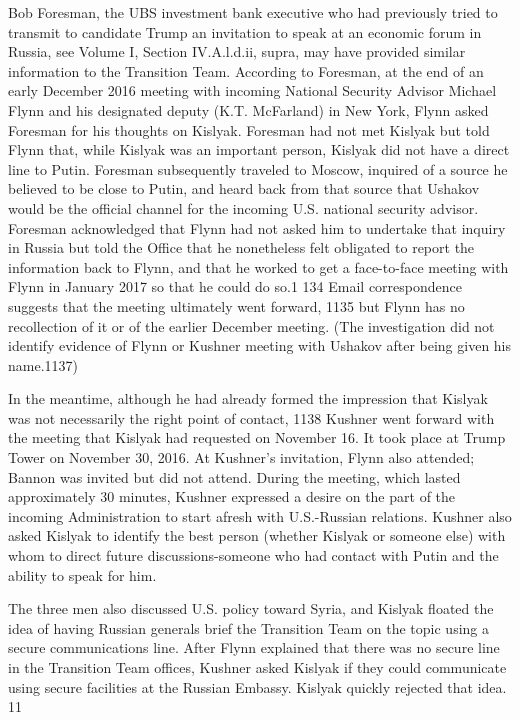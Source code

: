 Bob Foresman, the UBS investment bank executive who had previously tried to transmit to candidate Trump an invitation to speak at an economic forum in Russia, see Volume I, Section IV.A.l.d.ii, supra, may have provided similar information to the Transition Team. According to Foresman, at the end of an early December 2016 meeting with incoming National Security Advisor Michael Flynn and his designated deputy (K.T. McFarland) in New York, Flynn asked Foresman for his thoughts on Kislyak. Foresman had not met Kislyak but told Flynn that, while Kislyak was an important person, Kislyak did not have a direct line to Putin.%
Foresman subsequently traveled to Moscow, inquired of a source he believed to be close to Putin, and heard back from that source that Ushakov would be the official channel for the incoming U.S. national security advisor.%
Foresman acknowledged that Flynn had not asked him to undertake that inquiry in Russia but told the Office that he nonetheless felt obligated to report the information back to Flynn, and that he worked to get a face-to-face meeting with Flynn in January 2017 so that he could do so.1 134 Email correspondence suggests that the meeting ultimately went forward, 1135 but Flynn has no recollection of it or of the earlier December meeting.%
(The investigation did not identify evidence of Flynn or Kushner meeting with Ushakov after being given his name.1137)

In the meantime, although he had already formed the impression that Kislyak was not necessarily the right point of contact, 1138 Kushner went forward with the meeting that Kislyak had requested on November 16. It took place at Trump Tower on November 30, 2016.%
At Kushner's invitation, Flynn also attended; Bannon was invited but did not attend.%
During the meeting, which lasted approximately 30 minutes, Kushner expressed a desire on the part of the incoming Administration to start afresh with U.S.-Russian relations.%
Kushner also asked Kislyak to identify the best person (whether Kislyak or someone else) with whom to direct future discussions-someone who had contact with Putin and the ability to speak for him.%

The three men also discussed U.S. policy toward Syria, and Kislyak floated the idea of having Russian generals brief the Transition Team on the topic using a secure communications line.%
After Flynn explained that there was no secure line in the Transition Team offices, Kushner asked Kislyak if they could communicate using secure facilities at the Russian Embassy.%
Kislyak quickly rejected that idea. 11

